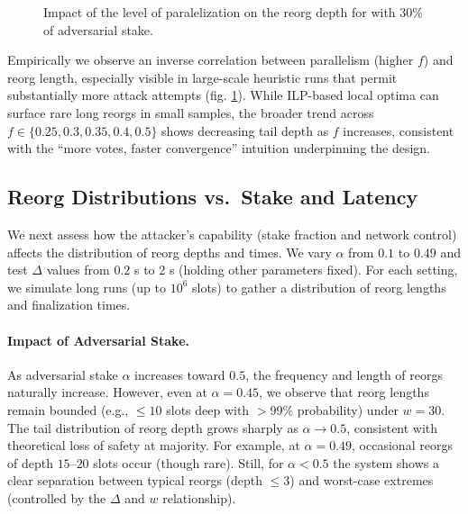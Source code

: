 \begin{figure}
\caption{Impact of the level of paralelization on the reorg depth for \ProjBase with 30\% of adversarial stake.}
\label{fig:pralellization}
\end{figure}
Empirically we observe an inverse correlation between parallelism (higher $f$) and reorg length, especially visible in large-scale heuristic runs that permit substantially more attack attempts (fig. \ref{fig:pralellization}). While ILP-based local optima can surface rare long reorgs in small samples, the broader trend across $f\in\{0.25,0.3,0.35,0.4,0.5\}$ shows decreasing tail depth as $f$ increases, consistent with the “more votes, faster convergence” intuition underpinning the design.

\subsection{Reorg Distributions vs.\ Stake and Latency}
We next assess how the attacker’s capability (stake fraction and network control) affects the distribution of reorg depths and times. We vary $\alpha$ from $0.1$ to $0.49$ and test $\Delta$ values from $0.2$ s to $2$ s (holding other parameters fixed). For each setting, we simulate long runs (up to $10^6$ slots) to gather a distribution of reorg lengths and finalization times.

\paragraph{Impact of Adversarial Stake.}
As adversarial stake $\alpha$ increases toward $0.5$, the frequency and length of reorgs naturally increase. However, even at $\alpha=0.45$, we observe that reorg lengths remain bounded (e.g., $\le 10$ slots deep with $>99\%$ probability) under $w=30$. The tail distribution of reorg depth grows sharply as $\alpha\to 0.5$, consistent with theoretical loss of safety at majority. For example, at $\alpha=0.49$, occasional reorgs of depth $15$--$20$ slots occur (though rare). Still, for $\alpha < 0.5$ the system shows a clear separation between typical reorgs (depth $\le 3$) and worst-case extremes (controlled by the $\Delta$ and $w$ relationship).

